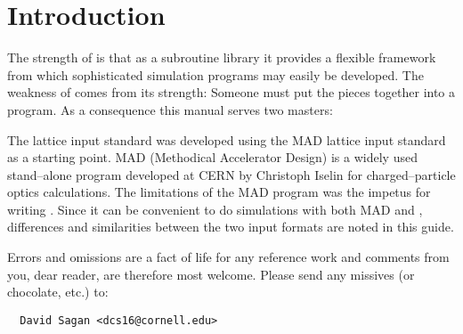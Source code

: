 \section*{Introduction}

The strength of \bmad is that as a subroutine library it provides a flexible
framework from which sophisticated simulation programs may easily be developed.
The weakness of \bmad comes from its strength: Someone must put the pieces 
together into a program. As a consequence this manual serves two masters:

The \bmad lattice input standard was developed using the MAD lattice
input standard as a starting point. MAD (Methodical Accelerator
Design) is a widely used stand--alone program developed at CERN by
Christoph Iselin for charged--particle optics calculations. The
limitations of the MAD program was the impetus for writing
\bmad. Since it can be convenient to do simulations with both MAD and
\bmad, differences and similarities between the two input formats are
noted in this guide.

Errors and omissions are a fact of life for any reference work and
comments from you, dear reader, are therefore most welcome. Please
send any missives (or chocolate, etc.) to:
\begin{verbatim}
  David Sagan <dcs16@cornell.edu>
\end{verbatim}
